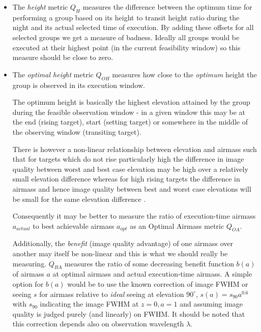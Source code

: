 \begin{itemize}
\item The \emph{height} metric $Q_H$ measures the difference between the optimum time for performing a group based on its height to transit height ratio during the night and its actual selected time of execution. By adding these offsets for all selected groups we get a measure of badness. Ideally all groups would be executed at their highest point (in the current feasibility window) so this measure should be close to zero. 

\item The \emph{optimal height} metric $Q_{OH}$  measures how close to the \emph{optimum} height the group is observed in its execution window. 

The optimum height is basically the highest elevation attained by the group during the feasible observation window - in a given window this may be at the end (rising target), start (setting target) or somewhere in the middle of the observing window (transiting target). 

There is however a non-linear relationship between elevation and airmass such that for targets which do not rise particularly high the difference in image quality between worst and best case elevation may be high over a relatively small elevation difference whereas for high rising targets the difference in airmass and hence image quality between best and worst case elevations will be small for the same elevation difference .

Consequently it may be better to measure the ratio of execution-time airmass $a_{actual}$ to best achievable airmass $a_{opt}$ as an Optimal Airmass metric $Q_{OA}$. 

Additionally, the \emph{benefit} (image quality advantage) of one airmass over another may itself be non-linear and this is what we should really be measuring. $Q_{BA}$  measures the ratio of some decreasing benefit function $b(a)$ of airmass $a$ at optimal airmass and actual execution-time airmass. A simple option for $b(a)$ would be to use the known \citep{sarazin90eso} correction of image FWHM or seeing $s$ for airmass relative to \emph{ideal} seeing at elevation $90^\circ$, $s(a)=s_{90}a^{0.6}$ with $s_{90}$ indicating the image FWHM at $z=0,a=1$ and assuming image quality is judged purely (and linearly) on FWHM. It should be noted that this correction depends also on observation wavelength $\lambda$. 


\end{itemize}
